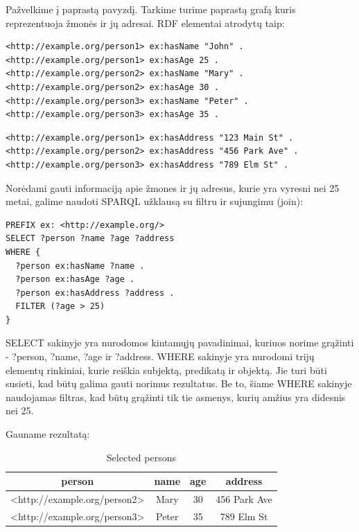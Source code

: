 \documentclass{VUMIFPSkursinis}
\begin{document}
Pažvelkime į paprastą pavyzdį. Tarkime turime paprastą grafą kuris reprezentuoja žmonės ir jų adresai.
RDF elementai atrodytų taip:
\begin{lstlisting}[captionpos=b, caption=Žmonių RDF, label=lst:sparql,
   basicstyle=\ttfamily,frame=single]
<http://example.org/person1> ex:hasName "John" .
<http://example.org/person1> ex:hasAge 25 .
<http://example.org/person2> ex:hasName "Mary" .
<http://example.org/person2> ex:hasAge 30 .
<http://example.org/person3> ex:hasName "Peter" .
<http://example.org/person3> ex:hasAge 35 .
\end{lstlisting}

\begin{lstlisting}[captionpos=b, caption=Adresų rdf, label=lst:sparql,
   basicstyle=\ttfamily,frame=single]
<http://example.org/person1> ex:hasAddress "123 Main St" .
<http://example.org/person2> ex:hasAddress "456 Park Ave" .
<http://example.org/person3> ex:hasAddress "789 Elm St" .
\end{lstlisting}

Norėdami gauti informaciją apie žmones ir jų adresus, kurie yra vyresni nei 25 metai, galime naudoti SPARQL užklausą su filtru ir sujungimu (join):
\begin{lstlisting}[captionpos=b, caption=Informaciją apie žmones ir jų adresus, label=lst:sparql,
   basicstyle=\ttfamily,frame=single]
PREFIX ex: <http://example.org/>
SELECT ?person ?name ?age ?address
WHERE {
  ?person ex:hasName ?name .
  ?person ex:hasAge ?age .
  ?person ex:hasAddress ?address .
  FILTER (?age > 25)
}
\end{lstlisting}
\pagebreak
SELECT sakinyje yra nurodomos kintamųjų pavadinimai, kuriuos norime grąžinti - ?person, ?name, ?age ir ?address. WHERE sakinyje yra nurodomi trijų elementų rinkiniai, kurie reiškia subjektą, predikatą ir objektą. Jie turi būti susieti, kad būtų galima gauti norimus rezultatus. Be to, šiame WHERE sakinyje naudojamas filtras, kad būtų grąžinti tik tie asmenys, kurių amžius yra didesnis nei 25.

Gauname rezultatą:

\begin{table}[h]
\centering
\begin{tabular}{|c|c|c|c|}
\hline
person & name & age & address \\
\hline
<http://example.org/person2> & Mary & 30 & 456 Park Ave \\
<http://example.org/person3> & Peter & 35 & 789 Elm St \\
\hline
\end{tabular}
\caption{Selected persons}
\end{table}
\end{document}
